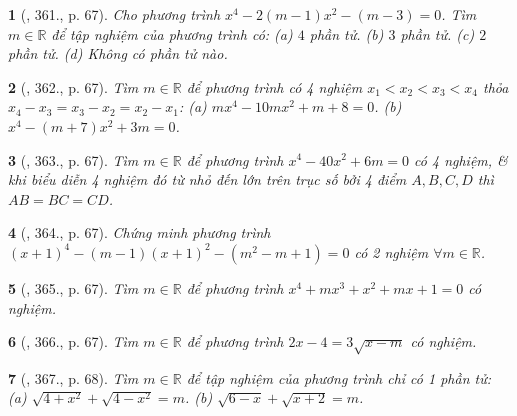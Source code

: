 \documentclass{article}
\newtheorem{baitoan}{}
\begin{document}
\begin{baitoan}[\cite{Binh_Toan_9_tap_2}, 361., p. 67]
	Cho phương trình $x^4 - 2(m - 1)x^2 - (m - 3) = 0$. Tìm $m\in\mathbb{R}$ để tập nghiệm của phương trình có: (a) $4$ phần tử. (b) $3$ phần tử. (c) $2$ phần tử. (d) Không có phần tử nào.
\end{baitoan}

\begin{baitoan}[\cite{Binh_Toan_9_tap_2}, 362., p. 67]
	Tìm $m\in\mathbb{R}$ để phương trình có 4 nghiệm $x_1 < x_2 < x_3 < x_4$ thỏa $x_4 - x_3 = x_3 - x_2 = x_2 - x_1$: (a) $mx^4 - 10mx^2 + m + 8 = 0$. (b) $x^4 - (m + 7)x^2 + 3m = 0$.
\end{baitoan}

\begin{baitoan}[\cite{Binh_Toan_9_tap_2}, 363., p. 67]
	Tìm $m\in\mathbb{R}$ để phương trình $x^4 - 40x^2 + 6m = 0$ có 4 nghiệm, \& khi biểu diễn 4 nghiệm đó từ nhỏ đến lớn trên trục số bởi 4 điểm $A,B,C,D$ thì $AB = BC = CD$.
\end{baitoan}

\begin{baitoan}[\cite{Binh_Toan_9_tap_2}, 364., p. 67]
	Chứng minh phương trình $(x + 1)^4 - (m - 1)(x + 1)^2 - (m^2 - m + 1) = 0$ có 2 nghiệm $\forall m\in\mathbb{R}$.
\end{baitoan}

\begin{baitoan}[\cite{Binh_Toan_9_tap_2}, 365., p. 67]
	Tìm $m\in\mathbb{R}$ để phương trình $x^4 + mx^3 + x^2 + mx + 1 = 0$ có nghiệm.
\end{baitoan}

\begin{baitoan}[\cite{Binh_Toan_9_tap_2}, 366., p. 67]
	Tìm $m\in\mathbb{R}$ để phương trình $2x - 4 = 3\sqrt{x - m}$ có nghiệm.
\end{baitoan}

\begin{baitoan}[\cite{Binh_Toan_9_tap_2}, 367., p. 68]
	Tìm $m\in\mathbb{R}$ để tập nghiệm của phương trình chỉ có 1 phần tử: (a) $\sqrt{4 + x^2} + \sqrt{4 - x^2} = m$. (b) $\sqrt{6 - x} + \sqrt{x + 2} = m$.
\end{baitoan}

\end{document}
